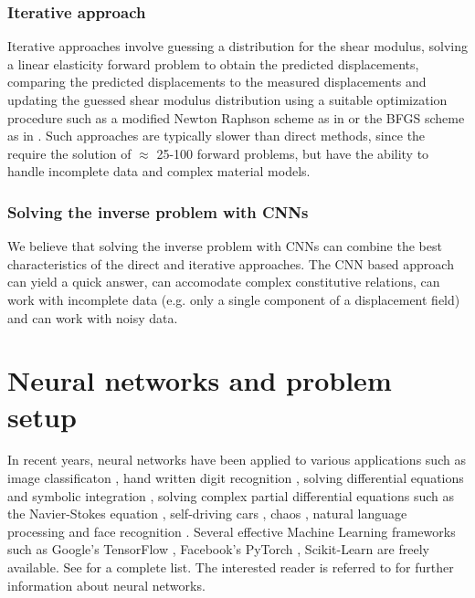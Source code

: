 \documentclass[12pt]{article}
\begin{document}
\subsubsection{Iterative approach} Iterative approaches \cite{paper:oberai2003,paper:gokhale2008,paper:kalle1996,paper:doyley,paper:goenezen2011} involve guessing a distribution for the shear modulus, solving a linear elasticity forward problem to obtain the predicted displacements, comparing the predicted displacements to the measured displacements and updating the guessed shear modulus distribution using a suitable optimization procedure such as a modified Newton Raphson scheme as in \cite{paper:doyley} or the BFGS scheme as in \cite{paper:gokhale2008,paper:goenezen2011}. Such approaches are typically slower than direct methods, since the require the solution of $\approx$ 25-100 forward problems, but have the ability to handle incomplete data and complex material models.
\subsubsection{Solving the inverse problem with CNNs}
We believe that solving the inverse problem with CNNs can combine the best characteristics of the direct and iterative approaches. The CNN based approach can yield a quick answer, can accomodate complex constitutive relations, can work with incomplete data (e.g. only a single component of a displacement field) and can work with noisy data.
\section{Neural networks and problem setup}
In recent years, neural networks have been applied to various applications such as image classificaton \cite{paper:hinton2017}, hand written digit recognition \cite{paper:kulkarni2018}, solving differential equations and symbolic integration \cite{misc:lample2019}, solving complex partial differential equations such as the Navier-Stokes equation \cite{misc:anandkumar2020}, self-driving cars \cite{misc:agnihotri2019,misc:nvidiaselfdriving2016}, chaos \cite{paper:pathak2018}, natural language processing \cite{misc:googlenlp} and face recognition \cite{conf:taigman2014}. Several effective Machine Learning frameworks such as Google's TensorFlow \cite{misc:tensorflow}, Facebook's PyTorch \cite{incollect:pytorch}, Scikit-Learn \cite{paper:scikit-learn} are freely available. See \cite{misc:compdeep} for a complete list. The interested reader is referred to \cite{book:aggarwal,book:goodfellow,book:chollet,misc:cs231n,misc:andrewng,misc:udemy} for further information about neural networks.
\end{document}
